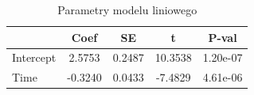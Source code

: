 \begin{table}[H]
\caption{Parametry modelu liniowego}
\label{tab:zad4_lin}
\begin{tabular}{lcccc}
\toprule
 & Coef & SE & t & P-val \\
\midrule
Intercept & 2.5753 & 0.2487 & 10.3538 & 1.20e-07 \\
Time & -0.3240 & 0.0433 & -7.4829 & 4.61e-06 \\
\bottomrule
\end{tabular}
\end{table}
